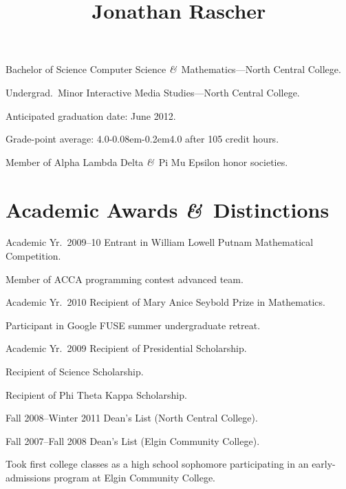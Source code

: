 \documentclass[11pt]{simplecv}
\newcommand*\amp{{\fertigopro\itshape\&}}
\newcommand*\fracslash{\kern-0.08em\raisebox{-0.3ex}{⁄}\kern-0.2em}
\begin{document}


  \title{Jonathan Rascher}
  \maketitle

  \begin{topic}
    \item[Bachelor of Science] Computer Science \amp\ Mathematics---North Central College.

    \item[Undergrad.\ Minor] Interactive Media Studies---North Central College.

    \item Anticipated graduation date: June 2012.

    Grade-point average: 4.0\fracslash 4.0 after 105 credit hours.

    Member of Alpha Lambda Delta \amp\ Pi Mu Epsilon honor societies.
  \end{topic}

  \section{Academic Awards \amp\ Distinctions}
  \begin{topic}
    \item[Academic Yr.\ 2009--10] Entrant in William Lowell Putnam Mathematical Competition.

    Member of ACCA programming contest advanced team.

    \item[Academic Yr.\ 2010] Recipient of Mary Anice Seybold Prize in Mathematics.

    Participant in Google FUSE summer undergraduate retreat.

    \item[Academic Yr.\ 2009] Recipient of Presidential Scholarship.

    Recipient of Science Scholarship.

    Recipient of Phi Theta Kappa Scholarship.

    \item[Fall 2008--Winter 2011] Dean's List (North Central College).

    \item[Fall 2007--Fall 2008] Dean's List (Elgin Community College).

    \item Took first college classes as a high school sophomore participating in an early-admissions program at Elgin Community College.
  \end{topic}
\end{document}

